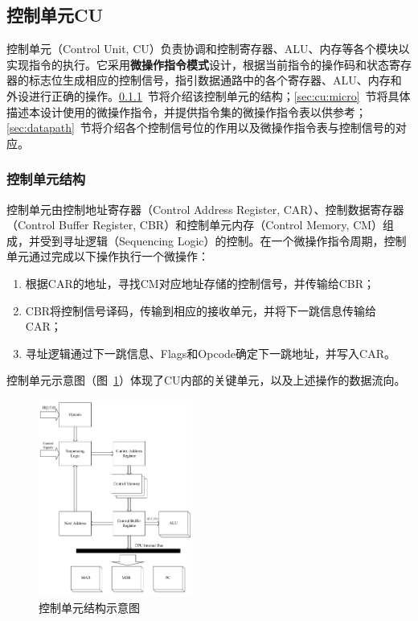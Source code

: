 \documentclass[lang=cn,a4paper,newtx]{elegantpaper}
\begin{document}

\subsection{控制单元CU}
控制单元（Control Unit, CU）负责协调和控制寄存器、ALU、内存等各个模块以实现指令的执行。它采用\textbf{微操作指令模式}设计，根据当前指令的操作码和状态寄存器的标志位生成相应的控制信号，指引数据通路中的各个寄存器、ALU、内存和外设进行正确的操作。\ref{sec:cu:structure}~节将介绍该控制单元的结构；\ref{sec:cu:micro}~节将具体描述本设计使用的微操作指令，并提供指令集的微操作指令表以供参考；\ref{sec:datapath}~节将介绍各个控制信号位的作用以及微操作指令表与控制信号的对应。

\subsubsection{控制单元结构}\label{sec:cu:structure}
控制单元由控制地址寄存器（Control Address Register, CAR）、控制数据寄存器（Control Buffer Register, CBR）和控制单元内存（Control Memory, CM）组成，并受到寻址逻辑（Sequencing Logic）的控制。在一个微操作指令周期，控制单元通过完成以下操作执行一个微操作：
\begin{enumerate}
  \item 根据CAR的地址，寻找CM对应地址存储的控制信号，并传输给CBR；
  \item CBR将控制信号译码，传输到相应的接收单元，并将下一跳信息传输给CAR；
  \item 寻址逻辑通过下一跳信息、Flags和Opcode确定下一跳地址，并写入CAR。
\end{enumerate}
控制单元示意图（图~\ref{fig:controlunit}）体现了CU内部的关键单元，以及上述操作的数据流向。

\begin{figure}[htbp]
  \centering
  \includegraphics[width = 0.45\textwidth]{figure/CU.pdf}
  \caption{控制单元结构示意图}
  \label{fig:controlunit}
\end{figure}
\end{document}
